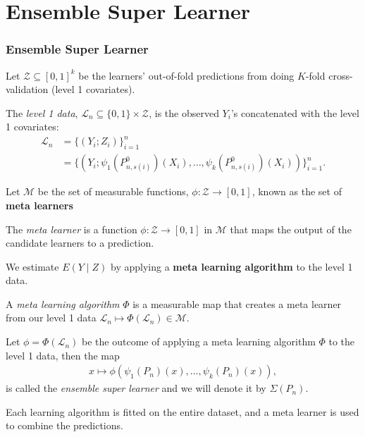 \documentclass{beamer}
\newcommand{\ml}{k}
\newcommand{\la}{\psi}
\newcommand{\lone}{\mathcal{L}}
\newcommand{\meta}{\phi}
\newcommand{\Meta}{\Phi}
\newcommand{\esl}{\Sigma}
\begin{document}
\section{Ensemble Super Learner}
\begin{frame}
    \frametitle{Ensemble Super Learner} 
    Let $ \mathcal{Z} \subseteq [0,1]^{\ml} $ be the learners' out-of-fold predictions from doing $ K $-fold cross-validation (level 1 covariates).
    \begin{definition}
    The \textit{level 1 data}, $ \lone_{n} \subseteq \{0,1\} \times \mathcal{Z} $, is the observed $ Y_i $'s concatenated with the level 1 covariates:
    \begin{align*}
        \lone_{n} &= \{(Y_i ; Z_i)\}_{i = 1}^{n} \\
            &= \{(Y_i; \la_1(P_{n, s(i)}^{0})(X_i), \ldots, \la_\ml(P_{n, s(i)}^{0})(X_i)) \}_{i = 1}^n. 
    \end{align*}
    \end{definition}
    Let $ \mathcal{M} $ be the set of measurable functions, $ \meta: \mathcal{Z} \to [0,1] $, known as the set of \textbf{meta learners} 
    \begin{definition}
        The \textit{meta learner} is a function $ \meta: \mathcal{Z} \to [0,1] $ in $ \mathcal{M} $ that maps the output of the candidate learners to a prediction. 
    \end{definition}
\end{frame}

\begin{frame}
    We estimate $ E(Y \mid Z) $ by applying a \textbf{meta learning algorithm} to the level 1 data. 
    \begin{definition}
        A \textit{meta learning algorithm} $ \Meta $ is a measurable map that creates a meta learner from our level 1 data $ \lone_{n} \mapsto \Meta(\lone_{n}) \in \mathcal{M} $. 
    \end{definition}

\begin{definition}
    Let $ \meta = \Meta(\lone_{n}) $ be the outcome of applying a meta learning algorithm $ \Meta $ to the level 1 data, then the map 
    \begin{align*}
       x \mapsto \meta(\la_1(P_{n})(x), \ldots, \la_k(P_{n})(x) ),
    \end{align*}
    is called the \textit{ensemble super learner} and we will denote it by $ \esl(P_{n}) $. 
\end{definition}
Each learning algorithm is fitted on the entire dataset, and a meta learner is used to combine the predictions.
\end{frame}
\end{document}
